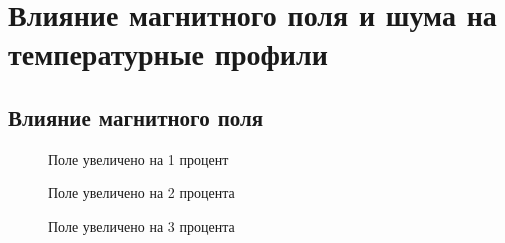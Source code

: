 \documentclass[a4paper]{article}
\begin{document}
\section*{Влияние магнитного поля и шума на температурные профили}
\subsection*{Влияние магнитного поля}
\begin{figure}[h!]
\caption{Поле увеличено на 1 процент}
\end{figure}
\begin{figure}[h!]
\caption{Поле увеличено на 2 процента}
\end{figure}
\begin{figure}[h!]
\caption{Поле увеличено на 3 процента}
\end{figure}
\end{document}

